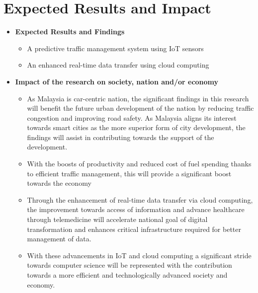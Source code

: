 \documentclass[12pt,a4paper]{article}
\begin{document}
\section{Expected Results and Impact}
\begin{itemize}
    \item \textbf{Expected Results and Findings }
    \begin{itemize}
        \item A predictive traffic management system using IoT sensors 

        \item An enhanced real-time data transfer using cloud computing 
    \end{itemize}
    \item \textbf{Impact of the research on society, nation and/or economy}
    \begin{itemize}
        \item As Malaysia is car-centric nation, the significant findings in this research will benefit the future urban development of the nation by reducing traffic congestion and improving road safety. As Malaysia aligns its interest towards smart cities as the more superior form of city development, the findings will assist in contributing towards the support of the development. 

        \item With the boosts of productivity and reduced cost of fuel spending thanks to efficient traffic management, this will provide a significant boost towards the economy 

        \item Through the enhancement of real-time data transfer via cloud computing, the improvement towards access of information and advance healthcare through telemedicine will accelerate national goal of digital transformation and enhances critical infrastructure required for better management of data. 

        \item With these advancements in IoT and cloud computing a significant stride towards computer science will be represented with the contribution towards a more efficient and technologically advanced society and economy. 
    \end{itemize}
\end{itemize}

\newpage
\end{document}
